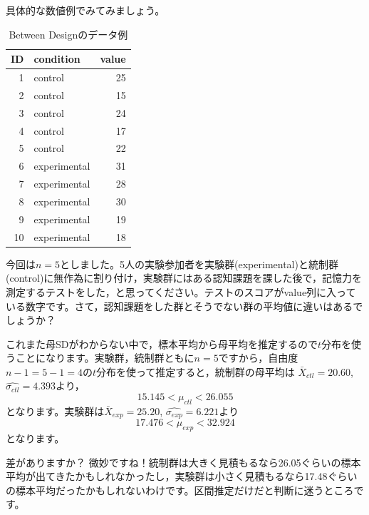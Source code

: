 \documentclass{ltjsbook}
\begin{document}
具体的な数値例でみてみましょう。
\begin{table}[ht]
    \centering
    \caption{Between Designのデータ例} 
    \begin{tabular}{rlr}
      \hline
    ID & condition & value \\ 
      \hline
    1 & control & 25 \\ 
      2 & control & 15 \\ 
      3 & control & 24 \\ 
      4 & control & 17 \\ 
      5 & control & 22 \\ 
      6 & experimental & 31 \\ 
      7 & experimental & 28 \\ 
      8 & experimental & 30 \\ 
      9 & experimental & 19 \\ 
      10 & experimental & 18 \\ 
       \hline
    \end{tabular}
    \label{tbl::19_02}
\end{table}
今回は$n=5$としました。5人の実験参加者を実験群(experimental)と統制群(control)に無作為に割り付け，実験群にはある認知課題を課した後で，記憶力を測定するテストをした，と思ってください。テストのスコアがvalue列に入っている数字です。さて，認知課題をした群とそうでない群の平均値に違いはあるでしょうか？ 

これまた母SDがわからない中で，標本平均から母平均を推定するので$t$分布を使うことになります。実験群，統制群ともに$n=5$ですから，自由度$n-1=5-1=4$の$t$分布を使って推定すると，統制群の母平均は
$\bar{X}_{ctl} =20.60$,$\hat{\sigma_{ctl}}=4.393$より，
\[15.145 < \mu_{ctl}<26.055 \]
となります。実験群は$\bar{X}_{exp} = 25.20$,
$\hat{\sigma_{exp}}=6.221$より
\[17.476<\mu_{exp}< 32.924 \]
となります。

差がありますか？ 微妙ですね！統制群は大きく見積もるなら26.05ぐらいの標本平均が出てきたかもしれなかったし，実験群は小さく見積もるなら17.48ぐらいの標本平均だったかもしれないわけです。区間推定だけだと判断に迷うところです。
\end{document}
